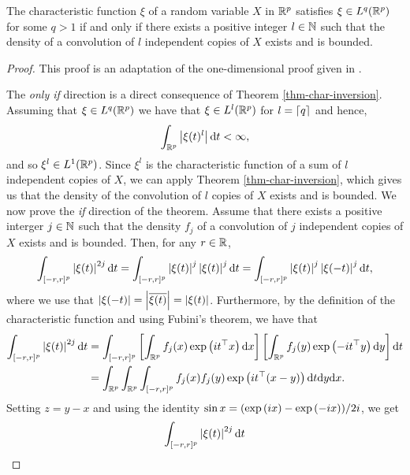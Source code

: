 \begin{lemma} \label{lem-char-integrable-convolution}
    The characteristic function $\xi$ of a random variable $X$ in $\Rp$ satisfies $\xi \in L^q(\Rp)$ for some $q > 1$ if and only if there exists a positive integer $l \in \N$ such that the density of a convolution of $l$ independent copies of $X$ exists and is bounded.
\end{lemma}
\begin{proof}
    This proof is an adaptation of the one-dimensional proof given in \cite[Lemma 2.4.4]{kolassa2006series}.

    The \textit{only if} direction is a direct consequence of Theorem \ref{thm-char-inversion}. Assuming that $\xi \in L^q(\Rp)$ we have that $\xi \in L^l(\Rp)$ for $l = \ceil{q}$ and hence,
    \begin{equation*}
        \intRp{t}{\abs{\xi(t)^l}} < \infty,
    \end{equation*}
    and so $\xi^l \in L^1(\Rp)$. Since $\xi^l$ is the characteristic function of a sum of $l$ independent copies of $X$, we can apply Theorem \ref{thm-char-inversion}, which gives us that the density of the convolution of $l$ copies of $X$ exists and is bounded.
    \newline
    We now prove the \textit{if} direction of the theorem. Assume that there exists a positive interger $j \in \N$ such that the density $f_j$ of a convolution of $j$ independent copies of $X$ exists and is bounded. Then, for any $r \in \R$,
    \begin{equation*}
        \int_{[-r, r]^p} \abs{\xi(t)}^{2j} \d t
        = \int_{[-r, r]^p} \abs{\xi(t)}^j\abs{\xi(t)}^j \d t
        = \int_{[-r, r]^p} \abs{\xi(t)}^j\abs{\xi(-t)}^j \d t,
    \end{equation*}
    where we use that $\abs{\xi(-t)} = \abs{\overline{\xi(t)}} = \abs{\xi(t)}$. Furthermore, by the definition of the characteristic function and using Fubini's theorem, we have that
    \begin{align*}
        \int_{[-r, r]^p} \abs{\xi(t)}^{2j} \d t
        &= \int_{[-r, r]^p} \left[\intRp{x}{f_j(x)\expf{it^\top x}}\right]\left[\intRp{y}{f_j(y)\expf{-it^\top y}}\right] \d t\\
        &= \intRp{x}{\intRp{y}{\int_{[-r, r]^p} f_j(x)f_j(y)\expf{it^\top (x - y)}\d t}}.
    \end{align*}
    Setting $z = y - x$ and using the identity $\sin x = (\expf{ix} - \expf{-ix}) / 2i$, we get
    \begin{align*}
        \int_{[-r, r]^p} \abs{\xi(t)}^{2j} \d t

\end{align*}
\end{proof}
